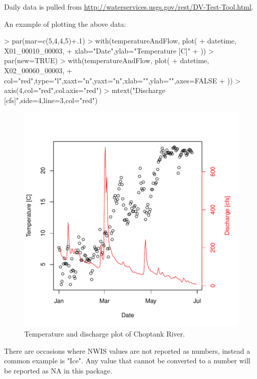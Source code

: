 \documentclass[a4paper,11pt]{article}
\begin{document}
Daily data is pulled from \url{http://waterservices.usgs.gov/rest/DV-Test-Tool.html}. 

An example of plotting the above data:
\begin{Schunk}
\begin{Sinput}
> par(mar=c(5,4,4,5)+.1)
> with(temperatureAndFlow, plot(
+   datetime, X01_00010_00003,
+   xlab="Date",ylab="Temperature [C]"
+   ))
> par(new=TRUE)
> with(temperatureAndFlow, plot(
+   datetime, X02_00060_00003,
+   col="red",type="l",xaxt="n",yaxt="n",xlab="",ylab="",axes=FALSE
+   ))
> axis(4,col="red",col.axis="red")
> mtext("Discharge [cfs]",side=4,line=3,col="red")
\end{Sinput}
\end{Schunk}
\begin{figure}
\begin{center}
\includegraphics{dataRetrieval-fig1}
\end{center}
\caption{Temperature and discharge plot of Choptank River.}
\end{figure}

There are occasions where NWIS values are not reported as numbers, instead a common example is "Ice".  Any value that cannot be converted to a number will be reported as NA in this package.

\end{document}
